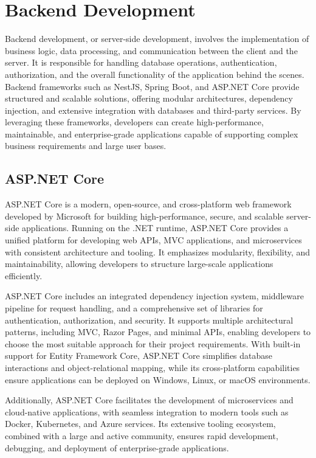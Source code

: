 \section{Backend Development}

Backend development, or server-side development, involves the implementation of business logic, data processing, and communication between the client and the server. It is responsible for handling database operations, authentication, authorization, and the overall functionality of the application behind the scenes. Backend frameworks such as NestJS, Spring Boot, and ASP.NET Core provide structured and scalable solutions, offering modular architectures, dependency injection, and extensive integration with databases and third-party services. By leveraging these frameworks, developers can create high-performance, maintainable, and enterprise-grade applications capable of supporting complex business requirements and large user bases.

\subsection{ASP.NET Core}

ASP.NET Core is a modern, open-source, and cross-platform web framework developed by Microsoft for building high-performance, secure, and scalable server-side applications. Running on the .NET runtime, ASP.NET Core provides a unified platform for developing web APIs, MVC applications, and microservices with consistent architecture and tooling. It emphasizes modularity, flexibility, and maintainability, allowing developers to structure large-scale applications efficiently.\cite{asp_net}

ASP.NET Core includes an integrated dependency injection system, middleware pipeline for request handling, and a comprehensive set of libraries for authentication, authorization, and security. It supports multiple architectural patterns, including MVC, Razor Pages, and minimal APIs, enabling developers to choose the most suitable approach for their project requirements. With built-in support for Entity Framework Core, ASP.NET Core simplifies database interactions and object-relational mapping, while its cross-platform capabilities ensure applications can be deployed on Windows, Linux, or macOS environments.  

Additionally, ASP.NET Core facilitates the development of microservices and cloud-native applications, with seamless integration to modern tools such as Docker, Kubernetes, and Azure services. Its extensive tooling ecosystem, combined with a large and active community, ensures rapid development, debugging, and deployment of enterprise-grade applications.


